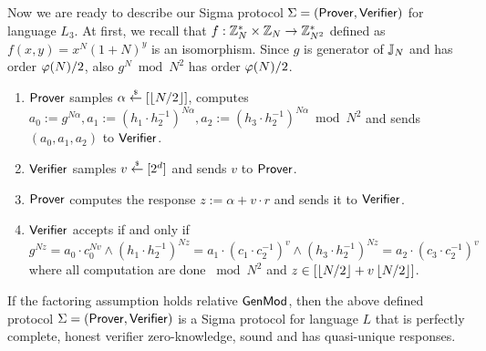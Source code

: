 Now we are ready to describe our Sigma protocol $\Sigma = (\mathsf{Prover}, \mathsf{Verifier})$ for language $L_3$. At first, we recall that $f:\mathbb{Z}_N^* \times \mathbb{Z}_N \rightarrow \mathbb{Z}_{N^2}^*$ defined as $f(x,y)=x^N(1+N)^y$ is an isomorphism. Since $g$ is generator of $\mathbb{J}_N$ and has order $\varphi(N)/2$, also $g^N \bmod N^2$ has order $\varphi(N)/2$. 
\begin{enumerate}
\item $\mathsf{Prover}$ samples $\alpha \stackrel{{\scriptscriptstyle\$}}{\leftarrow} [\left\lfloor N/2 \right\rfloor]$, computes $a_0:=g^{N\alpha}, a_1:= (h_1\cdot h_2^{-1})^{N\alpha}, a_2:= (h_3\cdot h_2^{-1})^{N\alpha} \bmod N^2$ and sends $(a_0, a_1, a_2)$ to $\mathsf{Verifier}$.
\item $\mathsf{Verifier}$ samples $v \stackrel{{\scriptscriptstyle\$}}{\leftarrow} [2^d]$ and sends $v$ to $\mathsf{Prover}$.
\item $\mathsf{Prover}$ computes the response $z:= \alpha + v \cdot r$ and sends it to $\mathsf{Verifier}$.
\item $\mathsf{Verifier}$ accepts if and only if $g^{Nz} = a_0 \cdot c_0^{Nv} \land (h_1\cdot h_2^{-1})^{Nz} = a_1 \cdot (c_1\cdot c_2^{-1})^v  \land (h_3\cdot h_2^{-1})^{Nz} = a_2 \cdot (c_3\cdot c_2^{-1})^v$ where all computation are done $\bmod N^2$ and $z \in [\left\lfloor N/2 \right\rfloor + v\left\lfloor N/2 \right\rfloor]$.
\end{enumerate}

\begin{theorem}
If the factoring assumption holds relative $\mathsf{GenMod}$, then the above defined protocol $\Sigma = (\mathsf{Prover}, \mathsf{Verifier})$ is a Sigma protocol for language $L$ that is perfectly complete, honest verifier zero-knowledge, sound and has quasi-unique responses. 
\end{theorem}

